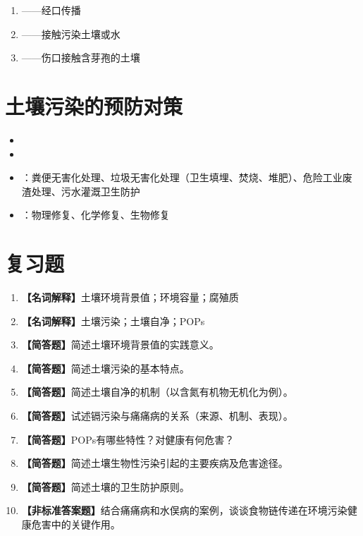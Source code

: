 \begin{enumerate}[leftmargin=*]
    \item {}——经口传播
    \item {}——接触污染土壤或水
    \item {}——伤口接触含芽孢的土壤
\end{enumerate}

\section{土壤污染的预防对策}

\begin{itemize}[leftmargin=*]
    \item {}
    \item {}
    \item {}：粪便无害化处理、垃圾无害化处理（卫生填埋、焚烧、堆肥）、危险工业废渣处理、污水灌溉卫生防护
    \item {}：物理修复、化学修复、生物修复
\end{itemize}

\section{复习题}

\begin{enumerate}[leftmargin=*, itemsep=8pt]
    \item \textbf{【名词解释】}土壤环境背景值；环境容量；腐殖质
    \item \textbf{【名词解释】}土壤污染；土壤自净；POPs
    \item \textbf{【简答题】}简述土壤环境背景值的实践意义。
    \item \textbf{【简答题】}简述土壤污染的基本特点。
    \item \textbf{【简答题】}简述土壤自净的机制（以含氮有机物无机化为例）。
    \item \textbf{【简答题】}试述镉污染与痛痛病的关系（来源、机制、表现）。
    \item \textbf{【简答题】}POPs有哪些特性？对健康有何危害？
    \item \textbf{【简答题】}简述土壤生物性污染引起的主要疾病及危害途径。
    \item \textbf{【简答题】}简述土壤的卫生防护原则。
    \item \textbf{【非标准答案题】}结合痛痛病和水俣病的案例，谈谈食物链传递在环境污染健康危害中的关键作用。
\end{enumerate}

